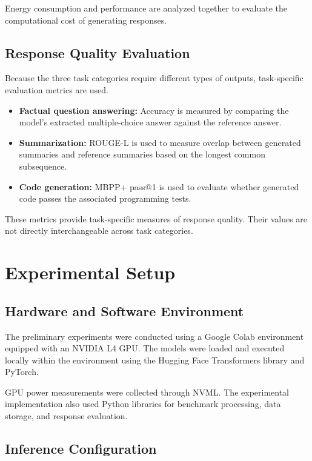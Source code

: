 \documentclass[conference]{IEEEtran}
\begin{document}
Energy consumption and performance are analyzed together to evaluate
the computational cost of generating responses.

\subsection{Response Quality Evaluation}

Because the three task categories require different types of outputs,
task-specific evaluation metrics are used.

\begin{itemize}
    \item \textbf{Factual question answering:} Accuracy is measured by
    comparing the model's extracted multiple-choice answer against
    the reference answer.
    \item \textbf{Summarization:} ROUGE-L is used to measure overlap
    between generated summaries and reference summaries based on the
    longest common subsequence.
    \item \textbf{Code generation:} MBPP+ pass@1 is used to evaluate
    whether generated code passes the associated programming tests.
\end{itemize}

These metrics provide task-specific measures of response quality.
Their values are not directly interchangeable across task categories.

\section{Experimental Setup}

\subsection{Hardware and Software Environment}

The preliminary experiments were conducted using a Google Colab
environment equipped with an NVIDIA L4 GPU. The models
were loaded and executed locally within the environment using the
Hugging Face Transformers library and PyTorch.

GPU power measurements were collected through NVML. The experimental
implementation also used Python libraries for benchmark processing,
data storage, and response evaluation.

\subsection{Inference Configuration}
\end{document}
